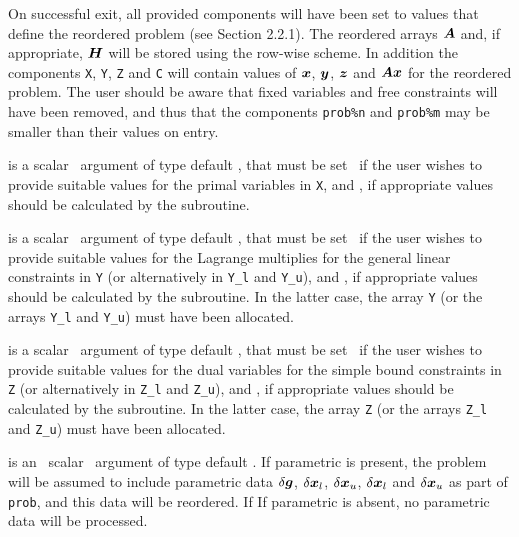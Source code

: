 \documentclass{galahad}
\begin{document}
\begin{description}

On successful exit, all provided components will have been set to values 
that define the reordered problem (see Section 2.2.1). The reordered 
arrays ${\bm{A}}$ and, if appropriate,  ${\bm{H}}$ will be stored using the row-wise
scheme. In addition the components
{\tt X}, {\tt Y}, {\tt Z} and {\tt C} will contain values of 
${\bm{x}}$, ${\bm{y}}$, ${\bm{z}}$ and ${\bm{A}} {\bm{x}}$ for the reordered problem. 
The user should be aware that fixed variables and free constraints will have 
been removed, and thus that the components {\tt prob\%n} and {\tt prob\%m} 
may be smaller than their values on entry. 

 is a scalar \intentin\ argument of type default \logical, that 
must be set \false\ if the user wishes to provide suitable values for the 
primal variables in {\tt X}, and \true, if appropriate values should be 
calculated by the subroutine. 
 
 is a scalar \intentin\ argument of type default \logical, that 
must be set \false\ if the user wishes to provide suitable values for the 
Lagrange multiplies for the general linear constraints in {\tt Y}
(or alternatively in {\tt Y\_l} and {\tt Y\_u}), 
and \true, if appropriate values should be calculated by the subroutine. 
In the latter case, the array {\tt Y} (or the arrays {\tt Y\_l} and {\tt Y\_u})
must have been allocated.
 
 is a scalar \intentin\ argument of type default \logical, that 
must be set \false\ if the user wishes to provide suitable values for the 
dual variables for the simple bound constraints in {\tt Z}
(or alternatively in {\tt Z\_l} and {\tt Z\_u}), and \true, 
if appropriate values should be calculated by the subroutine. 
In the latter case, the array {\tt Z} (or the arrays {\tt Z\_l} and {\tt Z\_u})
must have been allocated.

is an \optional\ scalar \intentin\ argument of type default \logical. 
If {parametric} is present, the problem will be assumed to include
parametric data $\delta {\bm{g}}$, $\delta {\bm{x}}_l$, $\delta {\bm{x}}_u$, 
$\delta {\bm{x}}_l$ and $\delta {\bm{x}}_u$ as part of {\tt prob},
and this data will be reordered. If 
If {parametric} is absent, no parametric data will be processed.
 
\end{description}
\end{document}
